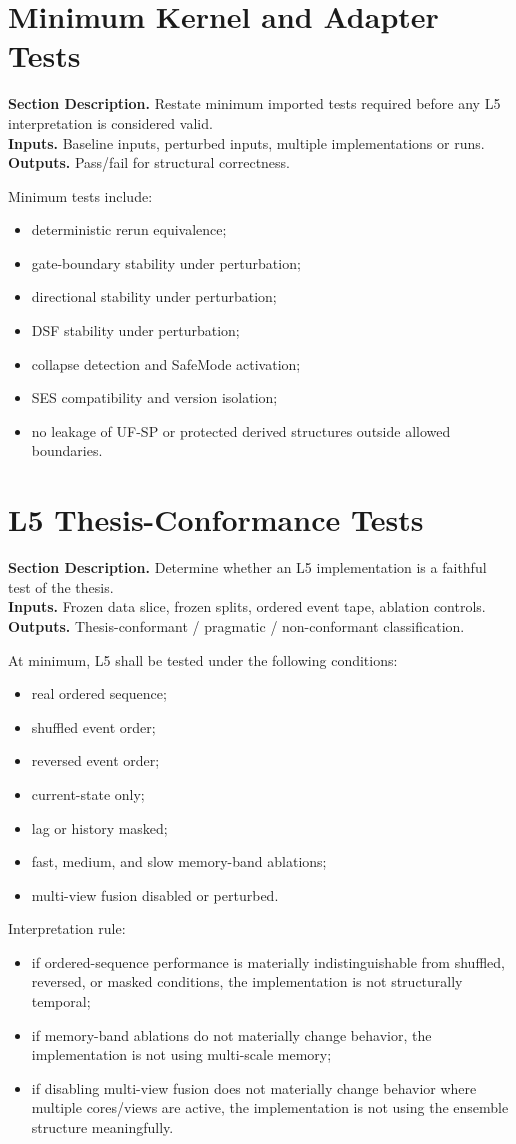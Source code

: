 \documentclass[11pt]{report}
\newcommand{\meta}[3]{\textbf{Section Description.} #1\\
\textbf{Inputs.} #2\\
\textbf{Outputs.} #3\par}
\begin{document}
\section{Minimum Kernel and Adapter Tests}
\meta{Restate minimum imported tests required before any L5 interpretation is considered valid.}{Baseline inputs, perturbed inputs, multiple implementations or runs.}{Pass/fail for structural correctness.}

Minimum tests include:
\begin{itemize}
    \item deterministic rerun equivalence;
    \item gate-boundary stability under perturbation;
    \item directional stability under perturbation;
    \item DSF stability under perturbation;
    \item collapse detection and SafeMode activation;
    \item SES compatibility and version isolation;
    \item no leakage of UF-SP or protected derived structures outside allowed boundaries.
\end{itemize}

\section{L5 Thesis-Conformance Tests}
\meta{Determine whether an L5 implementation is a faithful test of the thesis.}{Frozen data slice, frozen splits, ordered event tape, ablation controls.}{Thesis-conformant / pragmatic / non-conformant classification.}

At minimum, L5 shall be tested under the following conditions:
\begin{itemize}
    \item real ordered sequence;
    \item shuffled event order;
    \item reversed event order;
    \item current-state only;
    \item lag or history masked;
    \item fast, medium, and slow memory-band ablations;
    \item multi-view fusion disabled or perturbed.
\end{itemize}

Interpretation rule:
\begin{itemize}
    \item if ordered-sequence performance is materially indistinguishable from shuffled, reversed, or masked conditions, the implementation is not structurally temporal;
    \item if memory-band ablations do not materially change behavior, the implementation is not using multi-scale memory;
    \item if disabling multi-view fusion does not materially change behavior where multiple cores/views are active, the implementation is not using the ensemble structure meaningfully.
\end{itemize}
\end{document}
